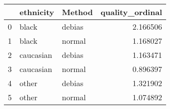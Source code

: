 \begin{tabular}{lllr}
\toprule
 & ethnicity & Method & quality_ordinal \\
\midrule
0 & black & debias & 2.166506 \\
1 & black & normal & 1.168027 \\
2 & caucasian & debias & 1.163471 \\
3 & caucasian & normal & 0.896397 \\
4 & other & debias & 1.321902 \\
5 & other & normal & 1.074892 \\
\bottomrule
\end{tabular}
